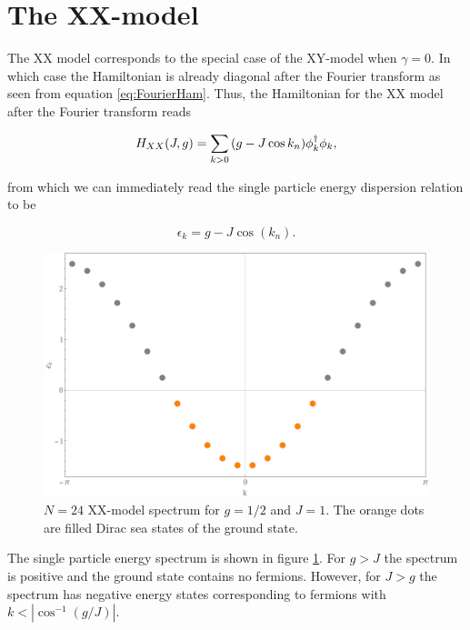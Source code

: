\section{The XX-model}\label{sec:XXmodel}

The XX model corresponds to the special case of the XY-model when $\gamma = 0$. In which case the Hamiltonian is already diagonal after the Fourier transform as seen from equation \eqref{eq:FourierHam}. Thus, the Hamiltonian for the XX model after the Fourier transform reads

\begin{equation}\label{eq:XXHam}
H_{XX}(J,g)  = \sum_{k>0}\qty(g - J\cos k_n)\phi_k^\dagger\phi_k,
\end{equation}

from which we can immediately read the single particle energy dispersion relation to be

\begin{equation}
\epsilon_k = g-J\cos(k_n).
\end{equation}

\begin{figure}[htb]
	\centering
	\includegraphics[scale=0.35]{figures/XXSpectrum.png}
	\caption{$N=24$ XX-model spectrum for $g=1/2$ and $J=1$. The orange dots are filled Dirac sea states of the ground state.}
	\label{fig:XXSpec}
\end{figure}

The single particle energy spectrum is shown in figure \ref{fig:XXSpec}. For $g>J$ the spectrum is positive and the ground state contains no fermions. However, for $J>g$ the spectrum has negative energy states corresponding to fermions with $k<|\cos^{-1}(g/J)|$.\\


